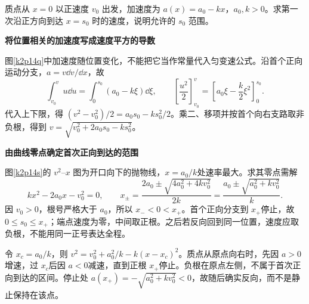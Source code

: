 \begin{question}\begin{example}[位置相关的线性加速度]\label{k2p14}
质点从 $x=0$ 以正速度 $v_0$ 出发，加速度为 $a(x)=a_0-kx$，$a_0,k>0$。求第一次沿正方向到达 $x=s_0$ 时的速度，说明允许的 $s_0$ 范围。\end{example}
\end{question}
\begin{solution}\textbf{将位置相关的加速度写成速度平方的导数}\par\nobreak
图\ref{k2p14q}中加速度随位置变化，不能把它当作常量代入匀变速公式。沿首个正向运动分支，$a=v\dd v/\dd x$，故
\[
 \int_{v_0}^{v}u\dd u=\int_0^{s_0}(a_0-k\xi)\dd\xi,
 \qquad
 \left[\frac{u^2}{2}\right]_{v_0}^{v}
 =\left[a_0\xi-\frac k2\xi^2\right]_0^{s_0}.
\]
代入上下限，得 $(v^2-v_0^2)/2=a_0s_0-ks_0^2/2$。乘二、移项并按首个向右支路取非负根，得到 $\boxed{v=\sqrt{v_0^2+2a_0s_0-ks_0^2}}$。


\par\medskip{}\noindent\textbf{由曲线零点确定首次正向到达的范围}\par\nobreak
图\ref{k2p14s}的 $v^2$--$x$ 图为开口向下的抛物线，$x=a_0/k$处速率最大。求其零点需解
\[
 kx^2-2a_0x-v_0^2=0,\qquad
 x_{\pm}=\frac{2a_0\pm\sqrt{4a_0^2+4kv_0^2}}{2k}
 =\frac{a_0\pm\sqrt{a_0^2+kv_0^2}}k.
\]
因 $v_0>0$，根号严格大于 $a_0$，所以 $x_-<0<x_+$。首个正向分支到 $x_+$停止，故 $0\le s_0\le x_+$；端点速度为零，中间取正根。之后若反向回到同一位置，速度应取负根，不能用同一正号表达全程。

令 $x_c=a_0/k$，则 $v^2=v_0^2+a_0^2/k-k(x-x_c)^2$。质点从原点向右时，先因 $a>0$增速，过 $x_c$后因 $a<0$减速，直到正根 $x_+$停止。负根在原点左侧，不属于首次正向到达的区间。停止处 $a(x_+)=-\sqrt{a_0^2+kv_0^2}<0$，故随后确实反向，而不是静止保持在该点。\end{solution}
